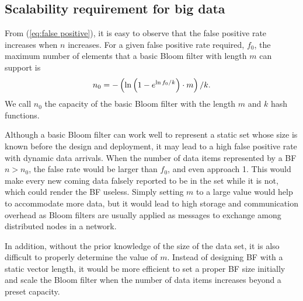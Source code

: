 \documentclass[10pt,journal,compsoc]{IEEEtran}
\newcommand{\rev}[1]{#1}
\begin{document}
\subsection{Scalability requirement for big data}
\label{subsec:Scalable bloom filter design for dynamic MCCS}
From (\ref{eq:false positive}), it is easy to observe that the false positive rate increases when $n$ increases.
For a given false positive rate required, $f_0$, the maximum number of elements that a basic Bloom filter with length $m$ can support is
\begin{equation}
\footnotesize
{n_0} =  - \left( {\ln \left( {1 - {e^{\ln {f_0}/k}}} \right) \cdot m} \right)/k.
\label{eq:n_0 calculation}
\end{equation}
We call ${n_0}$ the capacity of the basic Bloom filter with the length $m$ and $k$ hash functions.

Although a basic Bloom filter can work well to represent a static set whose size is known before the design and deployment, it may lead to a high false positive rate with dynamic data arrivals. When the number of data items represented by a BF $n > n_0$, the false rate would be larger than $f_0$, and even approach 1. This would make every new coming data falsely reported to be in the set while it is not, which could render the BF useless. Simply setting $m$ to a large value would help to accommodate more data, but it would lead to high storage and communication overhead  as Bloom filters are usually applied as messages to exchange among distributed nodes in a network.

In addition, without the prior knowledge of the size of the data set, it is also difficult to properly determine the value of $m$.
Instead of designing BF with a static vector length, it would be more efficient to set a proper BF size initially and scale the Bloom filter when the number of data items increases beyond a preset capacity.





\end{document}
